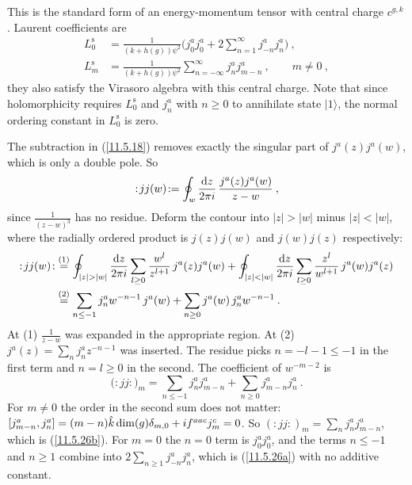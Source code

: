 This is the standard form of an energy-momentum tensor with central charge $c^{g,k}$. Laurent coefficients are
\begin{subequations}
	\begin{align}
		L_{0}^{\mathrm{s}} &= \frac{1}{(k+h(g))\psi^{2}}\biggl(j_{0}^{a}j_{0}^{a}
		+2\sum_{n=1}^{\infty}j_{-n}^{a}j_{n}^{a}\biggr) \:, \label{11.5.26a} \\
		L_{m}^{\mathrm{s}} &= \frac{1}{(k+h(g))\psi^{2}}\sum_{n=-\infty}^{\infty}j_{n}^{a}j_{m-n}^{a}\:,\qquad m\neq0\:,
		\label{11.5.26b}
	\end{align} \label{11.5.26}
\end{subequations}
they also satisfy the Virasoro algebra with this central charge. Note that since holomorphicity requires $L_{0}^{\mathrm{s}}$ and $j_{n}^{a}$ with $n\geq0$ to annihilate state $\lvert 1\rangle$, the normal ordering constant in $L_{0}^{\mathrm{s}}$ is zero.
\begin{tcolorbox}[breakable]
	\begin{remark}
		The subtraction in (\ref{11.5.18}) removes exactly the singular part of $j^{a}(z)j^{a}(w)$, which is only a double pole. So
		\begin{equation*}
			:\!jj(w)\!:=\oint_{w}\frac{\mathrm{d} z}{2\pi i}\,\frac{j^{a}(z)j^{a}(w)}{z-w}\:,
		\end{equation*}
		since $\frac{1}{(z-w)^{3}}$ has no residue. Deform the contour into $\lvert z\rvert>\lvert w\rvert$ minus $\lvert z\rvert<\lvert w\rvert$, where the radially ordered product is $j(z)j(w)$ and $j(w)j(z)$ respectively:
		\begin{align*}
			:\!jj(w)\!:&\overset{(1)}{=}\oint_{\lvert z\rvert>\lvert w\rvert}\frac{\mathrm{d} z}{2\pi i}\sum_{l\geq0}\frac{w^{l}}{z^{l+1}}\,j^{a}(z)j^{a}(w)
			+\oint_{\lvert z\rvert<\lvert w\rvert}\frac{\mathrm{d} z}{2\pi i}\sum_{l\geq0}\frac{z^{l}}{w^{l+1}}\,j^{a}(w)j^{a}(z)\\
			&\overset{(2)}{=}\sum_{n\leq-1}j^{a}_{n}w^{-n-1}\,j^{a}(w)+\sum_{n\geq0}j^{a}(w)\,j^{a}_{n}w^{-n-1}\:.
		\end{align*}
		At (1) $\frac{1}{z-w}$ was expanded in the appropriate region. At (2) $j^{a}(z)=\sum_{n}j^{a}_{n}z^{-n-1}$ was inserted. The residue picks $n=-l-1\leq-1$ in the first term and $n=l\geq0$ in the second. The coefficient of $w^{-m-2}$ is
		\begin{equation*}
			\bigl(:\!jj\!:\bigr)_{m}=\sum_{n\leq-1}j^{a}_{n}j^{a}_{m-n}+\sum_{n\geq0}j^{a}_{m-n}j^{a}_{n}\:.
		\end{equation*}
		For $m\neq0$ the order in the second sum does not matter: $[j^{a}_{m-n},j^{a}_{n}]=(m-n)\hat{k}\operatorname{dim}(g)\delta_{m,0}+i f^{aac}j^{c}_{m}=0$. So $(:\!jj\!:)_{m}=\sum_{n}j^{a}_{n}j^{a}_{m-n}$, which is (\ref{11.5.26b}). For $m=0$ the $n=0$ term is $j_{0}^{a}j_{0}^{a}$, and the terms $n\leq-1$ and $n\geq1$ combine into $2\sum_{n\geq1}j^{a}_{-n}j^{a}_{n}$, which is (\ref{11.5.26a}) with no additive constant.
	\end{remark}
\end{tcolorbox}

